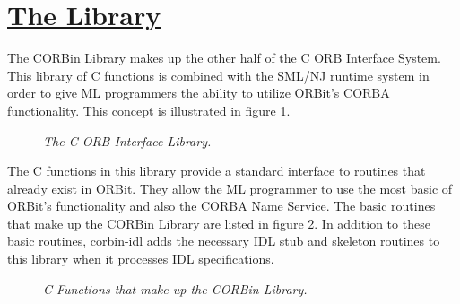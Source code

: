 \newpage
\section*{\underline{The Library}}

The CORBin Library makes up the other half of the C ORB Interface System.
This library of C functions is combined with the SML/NJ runtime system in 
order to give ML programmers the ability to utilize ORBit's CORBA 
functionality.  This concept is illustrated in figure \ref{CORBinVisual}. 
\begin{figure}
\begin{center}
\leavevmode
\caption{\em{The C ORB Interface Library}.}
\figline
         \label{CORBinVisual}
\end{center}
\end{figure}
The C functions in this library provide a standard interface 
to routines that already exist in ORBit.  They allow the ML programmer 
to use the most basic of ORBit's functionality and also the CORBA Name 
Service.  The basic routines that make up the CORBin Library are listed 
in figure \ref{CorbinLibrary}.  In addition to these basic routines, 
corbin-idl adds the necessary IDL stub and skeleton routines to this 
library when it processes IDL specifications.   
\begin{figure}
\begin{center}
\leavevmode
\caption{\em{C Functions that make up the CORBin Library}.}
\figline
         \label{CorbinLibrary}
\end{center}
\end{figure}


